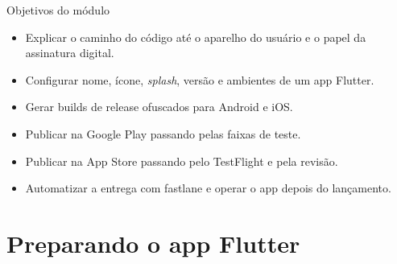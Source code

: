 \documentclass[aspectratio=169,10pt]{beamer}
\begin{document}
\capa

\begin{frame}{Objetivos do módulo}
  \begin{conceito}
    \begin{itemize}
      \item Explicar o caminho do código até o aparelho do usuário e o papel da assinatura digital.
      \item Configurar nome, ícone, \emph{splash}, versão e ambientes de um app Flutter.
      \item Gerar builds de release ofuscados para Android e iOS.
      \item Publicar na Google Play passando pelas faixas de teste.
      \item Publicar na App Store passando pelo TestFlight e pela revisão.
      \item Automatizar a entrega com fastlane e operar o app depois do lançamento.
    \end{itemize}
  \end{conceito}
\end{frame}

\sumario



\section{Preparando o app Flutter}
\end{document}
